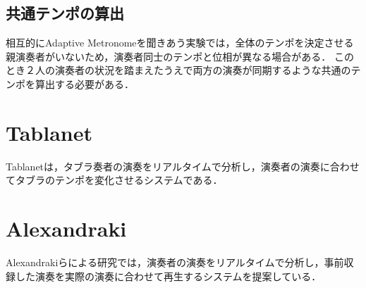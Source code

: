 \subsection{共通テンポの算出}
相互的にAdaptive Metronomeを聞きあう実験では，全体のテンポを決定させる親演奏者がいないため，演奏者同士のテンポと位相が異なる場合がある．
このとき２人の演奏者の状況を踏まえたうえで両方の演奏が同期するような共通のテンポを算出する必要がある．


\section{Tablanet}
Tablanet\cite{tablanet}は，タブラ奏者の演奏をリアルタイムで分析し，演奏者の演奏に合わせてタブラのテンポを変化させるシステムである．

\section{Alexandraki}
Alexandrakiらによる研究\cite{alexandraki:2013}\cite{alexandraki:2014}では，演奏者の演奏をリアルタイムで分析し，事前収録した演奏を実際の演奏に合わせて再生するシステムを提案している．
